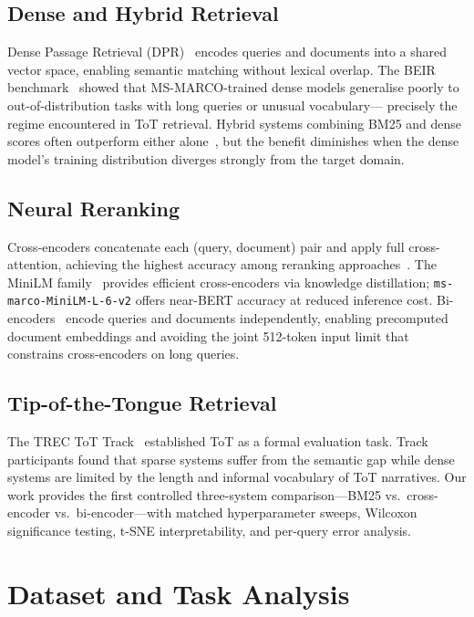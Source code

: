 \documentclass[conference]{IEEEtran}
\begin{document}
\subsection{Dense and Hybrid Retrieval}
Dense Passage Retrieval (DPR)~\cite{karpukhin2020} encodes queries and documents
into a shared vector space, enabling semantic matching without lexical overlap.
The BEIR benchmark~\cite{thakur2021} showed that MS-MARCO-trained dense models
generalise poorly to out-of-distribution tasks with long queries or unusual vocabulary---
precisely the regime encountered in ToT retrieval.
Hybrid systems combining BM25 and dense scores often outperform either alone~\cite{lin2021},
but the benefit diminishes when the dense model's training distribution diverges
strongly from the target domain.

\subsection{Neural Reranking}
Cross-encoders concatenate each (query, document) pair and apply full cross-attention,
achieving the highest accuracy among reranking approaches~\cite{lin2021}.
The MiniLM family~\cite{wang2020} provides efficient cross-encoders via knowledge
distillation; \texttt{ms-marco-MiniLM-L-6-v2} offers near-BERT accuracy at
reduced inference cost.
Bi-encoders~\cite{reimers2019} encode queries and documents independently,
enabling precomputed document embeddings and avoiding the joint 512-token input
limit that constrains cross-encoders on long queries.

\subsection{Tip-of-the-Tongue Retrieval}
The TREC ToT Track~\cite{trec-tot,bhatt2024} established ToT as a formal evaluation
task.
Track participants found that sparse systems suffer from the semantic gap while
dense systems are limited by the length and informal vocabulary of ToT narratives.
Our work provides the first controlled three-system comparison---BM25 vs.\
cross-encoder vs.\ bi-encoder---with matched hyperparameter sweeps, Wilcoxon
significance testing, t-SNE interpretability, and per-query error analysis.

\section{Dataset and Task Analysis}
\label{sec:dataset}
\end{document}
